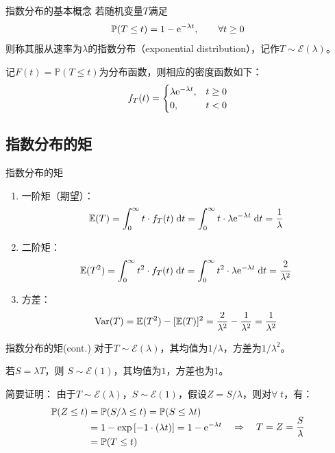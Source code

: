 \documentclass[t]{beamer}
\newcommand{\dif}{{\;\rm d}}
\renewcommand{\Pr}{\mathbb{P}}
\newcommand{\E}{\mathbb{E}}
\begin{document}
\begin{frame}{指数分布的基本概念}
    若随机变量$T$满足
\begin{equation*}
\Pr(T\le t)=1-{\rm e}^{-\lambda t},\qquad \forall t\ge 0
\end{equation*}
则称其服从速率为$\lambda$的指数分布（exponential distribution），记作$T\sim \mathcal{E}(\lambda)$。

记$F(t)=\Pr(T\le t)$为分布函数，则相应的密度函数如下：
\[f_T(t)=\begin{cases}
\lambda {\rm e}^{-\lambda t},& t\ge 0\\
0,& t<0
\end{cases} \]
\end{frame}

\subsection{指数分布的矩}
\begin{frame}{指数分布的矩}
    \begin{enumerate}
        \item 	一阶矩（期望）：
            \[\E(T)=\int^{\infty}_0 t\cdot f_T(t)\dif t=\int_{0}^{\infty}t\cdot \lambda {\rm e}^{-\lambda t}\dif t=\frac{1}{\lambda}
            \]
        \item 二阶矩：
        \[\E(T^2)=\int^{\infty}_0 t^2\cdot f_T(t)\dif t=\int_{0}^{\infty}t^2\cdot \lambda {\rm e}^{-\lambda t}\dif t=\frac{2}{\lambda^2}\]	
        \item 方差：
        \[{\rm Var}(T)= \E(T^2)-[\E(T)]^2=\frac{2}{\lambda^2}-\frac{1}{\lambda^2}=\frac{1}{\lambda^2}\]
        \end{enumerate}
\end{frame}


\begin{frame}{指数分布的矩(cont.)}
    对于$T\sim\mathcal{E}(\lambda)$，其均值为$1/\lambda$，方差为$1/\lambda^2$。
    
    若$S=\lambda T$，则
$S\sim\mathcal{E}(1)$，其均值为$1$，方差也为$1$。

\begin{block}{简要证明：}
	由于$T\sim\mathcal{E}(\lambda)$，$S\sim\mathcal{E}(1)$，假设$Z=S/\lambda$，则对$\forall\; t$，有：
	\[\begin{split}
	\Pr(Z\le t)&=\Pr(S/\lambda\le t)=\Pr(S\le \lambda t)\\
	&=1-\exp\left[-1\cdot (\lambda t)\right]=1-{\rm e}^{-\lambda t}\\
	&=\Pr(T\le t)
	\end{split}\quad \Rightarrow \quad T=Z=\frac{S}{\lambda}\]
\end{block}
\end{frame}
\end{document}

